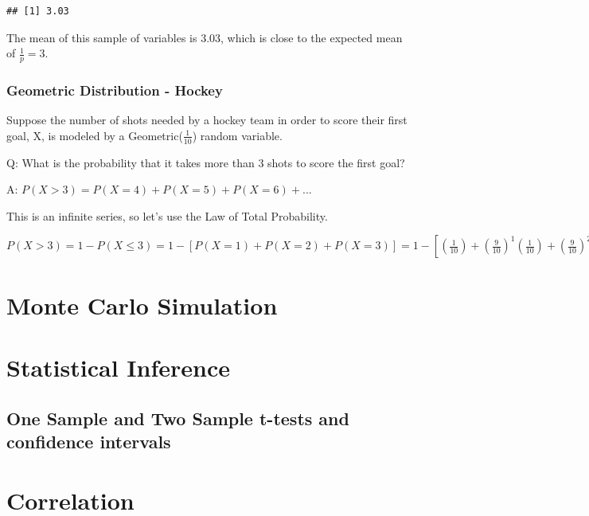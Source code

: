\documentclass[
]{book}
\theoremstyle{definition}
\theoremstyle{definition}
\theoremstyle{definition}
\theoremstyle{definition}
\theoremstyle{remark}
\begin{document}
\begin{verbatim}
## [1] 3.03
\end{verbatim}

The mean of this sample of variables is 3.03, which is close to the expected mean of \(\frac{1}{p} = 3\).

\hypertarget{geometric-distribution---hockey}{%
\subsection{Geometric Distribution - Hockey}\label{geometric-distribution---hockey}}

Suppose the number of shots needed by a hockey team in order to score their first goal, X, is modeled by a Geometric(\(\frac{1}{10}\)) random variable.

Q: What is the probability that it takes more than 3 shots to score the first goal?

A: \(P(X > 3) = P(X = 4) + P(X = 5) + P(X = 6) + ...\)

This is an infinite series, so let's use the Law of Total Probability.

\(P(X > 3) = 1 - P(X \leq 3) = 1 - [P(X = 1) + P(X = 2) + P(X = 3)] = 1 - [(\frac{1}{10}) + (\frac{9}{10})^1(\frac{1}{10}) + (\frac{9}{10})^2(\frac{1}{10})] = .729\)

\hypertarget{monte-carlo-simulation}{%
\chapter{Monte Carlo Simulation}\label{monte-carlo-simulation}}

\hypertarget{statistical-inference}{%
\chapter{Statistical Inference}\label{statistical-inference}}

\hypertarget{one-sample-and-two-sample-t-tests-and-confidence-intervals}{%
\section{One Sample and Two Sample t-tests and confidence intervals}\label{one-sample-and-two-sample-t-tests-and-confidence-intervals}}

\hypertarget{correlation}{%
\chapter{Correlation}\label{correlation}}
\end{document}
